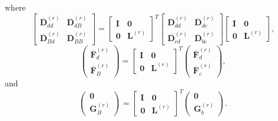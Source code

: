 {where}%
\begin{equation}
    \begin{bmatrix}
        \overline{\mathbf{D}}_{dd}^{(r)} &
        \overline{\mathbf{D}}_{dB}^{(r)} \\
        \overline{\mathbf{D}}_{Bd}^{(r)} &
        \overline{\mathbf{D}}_{BB}^{(r)}
    \end{bmatrix}
    =
    \begin{bmatrix}
        \mathbf{I} & \mathbf{0} \\
        \mathbf{0} & \mathbf{L}^{(r)}
    \end{bmatrix}^{T}
    \begin{bmatrix}
        \overline{\mathbf{D}}_{dd}^{(r)} &
        \overline{\mathbf{D}}_{dc}^{(r)} \\
        \overline{\mathbf{D}}_{cd}^{(r)} &
        \overline{\mathbf{D}}_{bc}^{(r)}
    \end{bmatrix}
    \begin{bmatrix}
        \mathbf{I} & \mathbf{0} \\
        \mathbf{0} & \mathbf{L}^{(r)}
    \end{bmatrix},
\end{equation}
\vspace{-1.0em}
\begin{equation}
    \begin{pmatrix}
        \overline{\mathbf{F}}_{d}^{(r)} \\
        \overline{\mathbf{F}}_{B}^{(r)}
    \end{pmatrix}
    =
    \begin{bmatrix}
        \mathbf{I} & \mathbf{0} \\
        \mathbf{0} & \mathbf{L}^{(r)}
    \end{bmatrix}^{T}
    \begin{pmatrix}
        \overline{\mathbf{F}}_{d}^{(r)} \\
        \overline{\mathbf{F}}_{c}^{(r)}
    \end{pmatrix},
\end{equation}
{and}%
\begin{equation}
    \begin{pmatrix}
        \mathbf{0} \\
        \mathbf{G}_{B}^{(r)}
    \end{pmatrix}
    =
    \begin{bmatrix}
        \mathbf{I} & \mathbf{0} \\
        \mathbf{0} & \mathbf{L}^{(r)}
    \end{bmatrix}^{T}
    \begin{pmatrix}
        \mathbf{0} \\
        \mathbf{G}_{b}^{(r)}
    \end{pmatrix}.
\end{equation}

